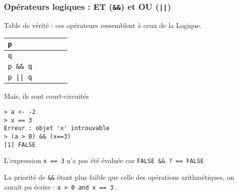 \documentclass[10pt]{beamer}
\begin{document}
\begin{frame}[fragile]
  \frametitle{Opérateurs logiques : ET (\texttt{\&\&}) et OU (\texttt{||})}
  \begin{block}{Table de vérité : ces opérateurs ressemblent à ceux de la Logique.}
  \begin{table}
    \centering
    \begin{tabular}{|l|c|c|c|c|}
      \hline
      \texttt{p}        & \T & \T & \F & \F \\ \hline
      \texttt{q}        & \T & \F & \T & \F \\ \hline
      \texttt{p \&\& q} & \T & \F & \F & \F \\ \hline
      \texttt{p || q} & \T & \T & \T & \F \\ \hline
    \end{tabular}
  \end{table}
\end{block}


\begin{block}{Mais, ils sont court-circuités}
  \begin{lstlisting}[style=block]
> a <- -2
> x == 3
Erreur : objet 'x' introuvable
> (a > 0) && (x==3)
[1] FALSE    
\end{lstlisting}
L'expression \lstinline[columns=fixed]{x == 3} n'a pas été évaluée car \texttt{FALSE \&\& ? == FALSE}

La priorité de \texttt{\&\&} étant plus faible que celle des opérations arithmétiques,
on aurait pu écrire : \lstinline[columns=fixed]{a > 0 and x == 3} .

\end{block}
\end{frame}


\end{document}
